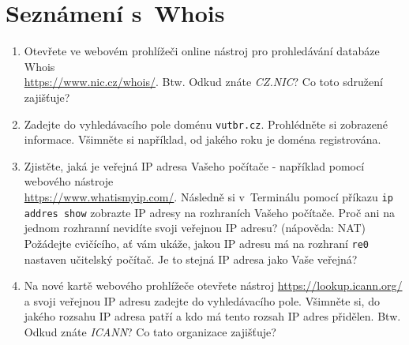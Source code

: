 \section{Seznámení s~Whois}
\begin{enumerate}
    \item Otevřete ve webovém prohlížeči online nástroj pro prohledávání databáze Whois\\ \url{https://www.nic.cz/whois/}. Btw. Odkud znáte \emph{CZ.NIC}? Co toto sdružení zajišťuje?
    \item Zadejte do vyhledávacího pole doménu \texttt{vutbr.cz}. Prohlédněte si zobrazené informace. Všimněte si například, od jakého roku je doména registrována.
    \item Zjistěte, jaká je veřejná IP adresa Vašeho počítače - například pomocí webového nástroje\\ \url{https://www.whatismyip.com/}. Následně si v~Terminálu pomocí příkazu \texttt{ip addres show} zobrazte IP adresy na rozhraních Vašeho počítače. Proč ani na jednom rozhranní nevidíte svoji veřejnou IP adresu? (nápověda: NAT) Požádejte cvičícího, ať vám ukáže, jakou IP adresu má na rozhraní \texttt{re0} nastaven učitelský počítač. Je to stejná IP adresa jako Vaše veřejná?
    \item Na nové kartě webového prohlížeče otevřete nástroj \url{https://lookup.icann.org/} a svoji veřejnou IP adresu zadejte do vyhledávacího pole. Všimněte si, do jakého rozsahu IP adresa patří a kdo má tento rozsah IP adres přidělen. Btw. Odkud znáte \emph{ICANN}? Co tato organizace zajišťuje?
\end{enumerate}

